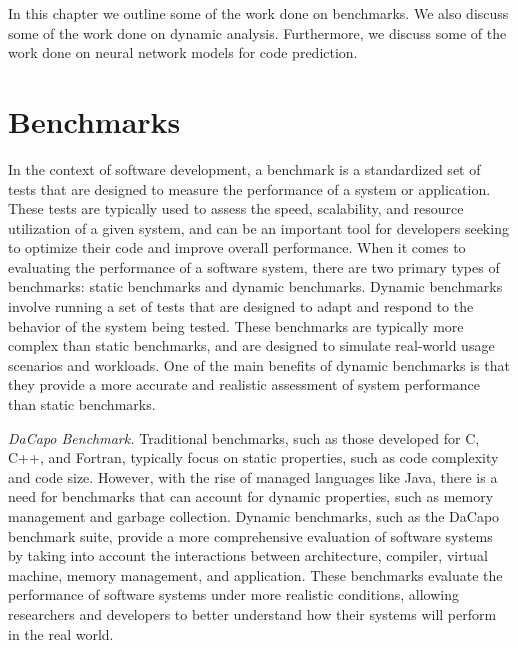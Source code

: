 In this chapter we outline some of the work done on benchmarks.
We also discuss some of the work done on dynamic analysis.
Furthermore, we discuss some of the work done on neural network models for code prediction.

\section{Benchmarks}
In the context of software development, a benchmark is a standardized set of tests that are designed to measure the performance of a system or application.
These tests are typically used to assess the speed, scalability, and resource utilization of a given system, and can be an important tool for developers seeking to optimize their code and improve overall performance.
When it comes to evaluating the performance of a software system, there are two primary types of benchmarks: static benchmarks and dynamic benchmarks.
Dynamic benchmarks involve running a set of tests that are designed to adapt and respond to the behavior of the system being tested. These benchmarks are typically more complex than static benchmarks, and are designed to simulate real-world usage scenarios and workloads.
One of the main benefits of dynamic benchmarks is that they provide a more accurate and realistic assessment of system performance than static benchmarks.

\textit{DaCapo Benchmark.} Traditional benchmarks, such as those developed for C, C++, and Fortran, typically focus on static properties, such as code complexity and code size.
However, with the rise of managed languages like Java, there is a need for benchmarks that can account for dynamic properties, such as memory management and garbage collection.
Dynamic benchmarks, such as the DaCapo benchmark suite, provide a more comprehensive evaluation of software systems by taking into account the interactions between architecture, compiler, virtual machine, memory management, and application. These benchmarks evaluate the performance of software systems under more realistic conditions, allowing researchers and developers to better understand how their systems will perform in the real world. \cite{DaCapo_2006}

